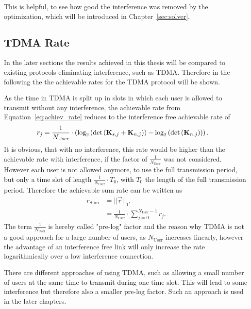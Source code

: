 This is helpful, to see how good the interference was removed by the optimization, which will be introduced in Chapter~\ref{sec:solver}.



\subsection{TDMA Rate}
\label{sec:tdma_rate}
In the later sections the results achieved in this thesis will be compared to existing protocols eliminating interference, such as TDMA.
Therefore in the following the the achievable rates for the TDMA protocol will be shown.

As the time in TDMA is split up in slots in which each user is allowed to transmit without any interference, the achievable rate from Equation~\eqref{eq:achiev_rate} reduces to the interference free achievable rate of 
\begin{align}
\label{eq:tdma_achiev_rate}
r_j  &=\frac{1}{N_\text{User}}\cdot\left(
		\text{log}_2\left(\text{det}\left(\mathbf{K}_{s,j}+\mathbf{K}_{n,j}\right)\right) -
	     	\text{log}_2\left(\text{det}\left(\mathbf{K}_{n,j}\right)\right)\right).
\end{align}
It is obvious, that with no interference, this rate would be higher than the achievable rate with interference, if the factor of $\frac{1}{N_\text{User}}$ was not considered.
However each user is not allowed anymore, to use the full transmission period, but only a time slot of length $\frac{1}{N_\text{User}}\cdot T_0$, with $T_0$ the length of the full transmission period.
Therefore the achievable sum rate can be written as
\begin{align}
\label{eq:tdma_achiev_sum_rate}
\nonumber
r_\text{Sum} &= ||\vec{r}||_1,\\
&= \frac{1}{N_\text{User}}\cdot \sum_{j=0}^{N_\text{User}-1} r_j.
\end{align}
The term $\frac{1}{N_\text{User}}$ is hereby called "pre-log" factor and the reason why TDMA is not a good approach for a large number of users, as $N_\text{User}$ increases linearly, however the advantage of an interference free link will only increase the rate logarithmically over a low interference connection.

There are different approaches of using TDMA, such as allowing a small number of users at the same time to transmit during one time slot.
This will lead to some interference but therefore also a smaller pre-log factor.
Such an approach is used in the later chapters.





